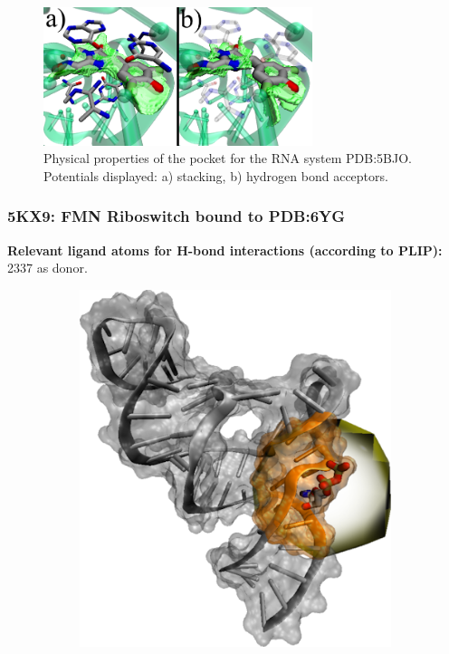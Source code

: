       \begin{figure}[H]
        \centering
        \includegraphics[width=0.7\textwidth]{figures/results/benchmark_rna/5bjo.png}
        \caption{\label{fig:benchmark/5bjo} Physical properties of the pocket for the RNA system PDB:5BJO. Potentials displayed: a) stacking, b) hydrogen bond acceptors.}
      \end{figure}
    \pagebreak

    \subsubsection{5KX9: FMN Riboswitch bound to PDB:6YG}
      \textbf{Relevant ligand atoms for H-bond interactions (according to PLIP):} 2337 as donor.

      \begin{figure}[H] \centering
        \begin{subfigure}[c]{0.3\textwidth} \centering
          \includegraphics[width=1\textwidth]{figures/results/ps_rna/6tf3.png}
        \end{subfigure}
        \begin{subfigure}[c]{0.3\textwidth} \centering
        \end{subfigure}
      \end{figure}

